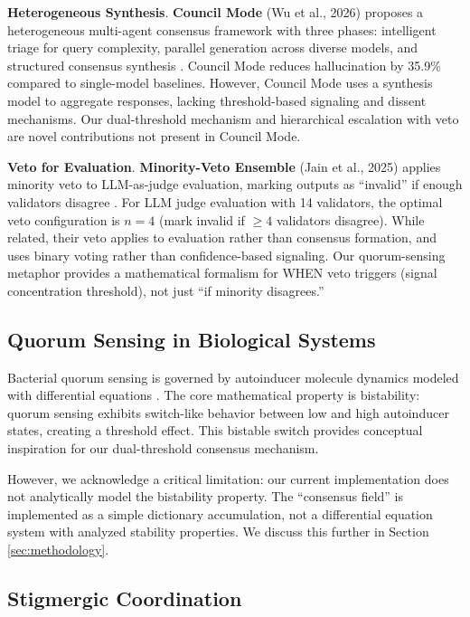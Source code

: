 \documentclass[11pt,letterpaper]{article}
\begin{document}
\textbf{Heterogeneous Synthesis}. \textbf{Council Mode} (Wu et al., 2026) proposes a heterogeneous multi-agent consensus framework with three phases: intelligent triage for query complexity, parallel generation across diverse models, and structured consensus synthesis \cite{Wu2026}. Council Mode reduces hallucination by 35.9\% compared to single-model baselines. However, Council Mode uses a synthesis model to aggregate responses, lacking threshold-based signaling and dissent mechanisms. Our dual-threshold mechanism and hierarchical escalation with veto are novel contributions not present in Council Mode.

\textbf{Veto for Evaluation}. \textbf{Minority-Veto Ensemble} (Jain et al., 2025) applies minority veto to LLM-as-judge evaluation, marking outputs as ``invalid'' if enough validators disagree \cite{Jain2025}. For LLM judge evaluation with 14 validators, the optimal veto configuration is $n=4$ (mark invalid if $\geq 4$ validators disagree). While related, their veto applies to evaluation rather than consensus formation, and uses binary voting rather than confidence-based signaling. Our quorum-sensing metaphor provides a mathematical formalism for WHEN veto triggers (signal concentration threshold), not just ``if minority disagrees.''

\subsection{Quorum Sensing in Biological Systems}

Bacterial quorum sensing is governed by autoinducer molecule dynamics modeled with differential equations \cite{Miller2001, Williams2020}. The core mathematical property is bistability: quorum sensing exhibits switch-like behavior between low and high autoinducer states, creating a threshold effect. This bistable switch provides conceptual inspiration for our dual-threshold consensus mechanism.

However, we acknowledge a critical limitation: our current implementation does not analytically model the bistability property. The ``consensus field'' is implemented as a simple dictionary accumulation, not a differential equation system with analyzed stability properties. We discuss this further in Section \ref{sec:methodology}.

\subsection{Stigmergic Coordination}
\end{document}
